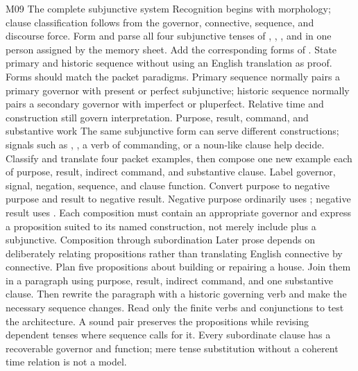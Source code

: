 \begin{courseunit}{M09}
\SubmoduleExtension
  {The complete subjunctive system}
  {Recognition begins with morphology; clause classification follows from the
  governor, connective, sequence, and discourse force.}
  {Form and parse all four subjunctive tenses of , ,
  , and  in one person assigned by the memory sheet.
  Add the corresponding forms of .}
  {State primary and historic sequence without using an English translation as
  proof.}
  {Forms should match the packet paradigms.  Primary sequence normally pairs a
  primary governor with present or perfect subjunctive; historic sequence
  normally pairs a secondary governor with imperfect or pluperfect.  Relative
  time and construction still govern interpretation.}
\SubmoduleExtension
  {Purpose, result, command, and substantive work}
  {The same subjunctive form can serve different constructions; signals such
  as , , a verb of commanding, or a noun-like clause
  help decide.}
  {Classify and translate four packet examples, then compose one new example
  each of purpose, result, indirect command, and substantive clause.  Label
  governor, signal, negation, sequence, and clause function.}
  {Convert purpose to negative purpose and result to negative result.}
  {Negative purpose ordinarily uses ; negative result uses
  .  Each composition must contain an appropriate governor and
  express a proposition suited to its named construction, not merely include
   plus a subjunctive.}
\SubmoduleExtension
  {Composition through subordination}
  {Later prose depends on deliberately relating propositions rather than
  translating English connective by connective.}
  {Plan five propositions about building or repairing a house.  Join them in
  a paragraph using purpose, result, indirect command, and one substantive
  clause.  Then rewrite the paragraph with a historic governing verb and make
  the necessary sequence changes.}
  {Read only the finite verbs and conjunctions to test the architecture.}
  {A sound pair preserves the propositions while revising dependent tenses
  where sequence calls for it.  Every subordinate clause has a recoverable
  governor and function; mere tense substitution without a coherent time
  relation is not a model.}
\end{courseunit}

